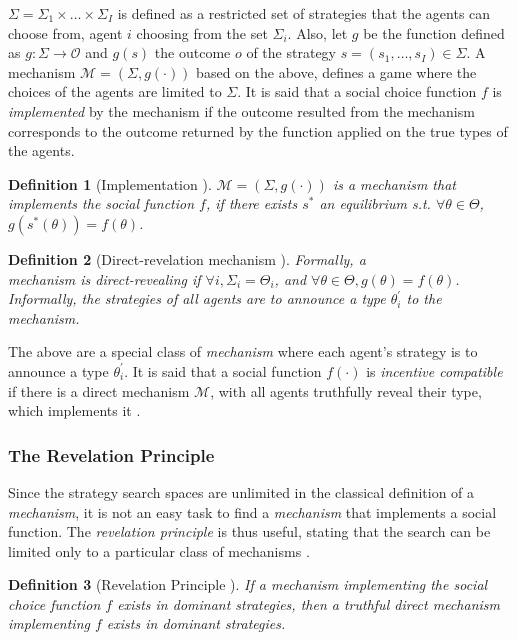 \documentclass[12pt, a4paper]{article}
\newtheorem{Def}{Definition}[subsection]
\begin{document}
$\Sigma=\Sigma_1 \times \dots \times \Sigma_I$ is defined as a restricted set
of strategies that the agents can choose from, agent $i$ choosing from the set
$\Sigma_i$. Also, let $g$ be the function defined as
$g:\Sigma\rightarrow\mathcal{O}$ and $g(s)$ the outcome $o$ of the strategy
$s=(s_1,\dots,s_I)\in\Sigma$. A mechanism $\mathcal{M}=(\Sigma,g(\cdot))$ based
on the above, defines a game where the choices of the agents are limited to
$\Sigma$. It is said that a social choice function $f$ is \emph{implemented} by
the mechanism if the outcome resulted from the mechanism corresponds to the
outcome returned by the function applied on the true types of the agents.

\begin{Def}[Implementation \cite{weiss}] $\mathcal{M}=(\Sigma, g(\cdot))$ is a mechanism
    that implements the social function $f$, if there exists $s^*$ an
    equilibrium s.t. $\forall \theta\in\Theta$, $g(s^*(\theta))=f(\theta)$.  
\end{Def}

\begin{Def}[Direct-revelation mechanism \cite{weiss}] Formally, a \\mechanism is
    direct-revealing if $\forall i, \Sigma_i=\Theta_i$, and $\forall \theta \in
    \Theta, g(\theta)=f(\theta)$.
    Informally, the strategies of all agents are to announce a type $\theta_i^{'}$
    to the \emph{mechanism}.
\end{Def}

The above are a special class of \emph{mechanism} where each agent's strategy
is to announce a type $\theta_i^{'}$. It is said that a social function
$f(\cdot)$ is \emph{incentive compatible} if there is a direct mechanism
$\mathcal{M}$, with all agents truthfully reveal their type, which implements
it \cite{mas1995microeconomic}.

\subsubsection{The Revelation Principle}

Since the strategy search spaces are unlimited in the classical definition of a
\emph{mechanism}, it is not an easy task to find a \emph{mechanism} that
implements a social function. The \emph{revelation principle} is thus useful,
stating that the search can be limited only to a particular class of mechanisms
\cite{mas1995microeconomic}.

\begin{Def}[Revelation Principle \cite{weiss}] If a mechanism implementing the
    social choice function $f$ exists in dominant strategies, then a truthful
    direct mechanism implementing $f$ exists in dominant strategies.
\end{Def}
\end{document}
